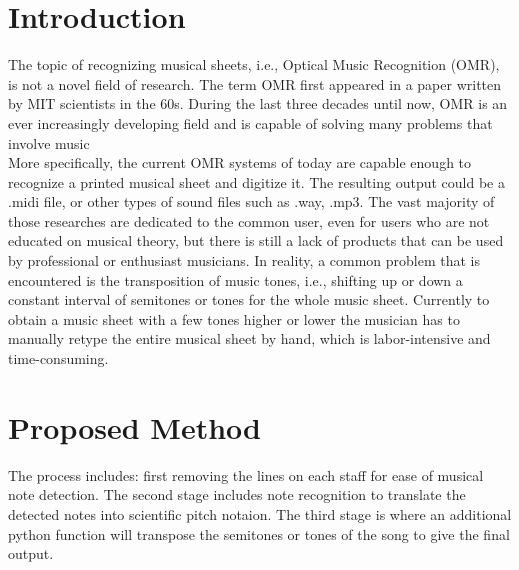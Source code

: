 \documentclass[a4paper,12pt]{report}
\begin{document}



\section{Introduction}

The topic of recognizing musical sheets, i.e., Optical Music Recognition (OMR),
is not a novel field of research. The term OMR first appeared in a paper written
by MIT scientists in the 60s.  During the last three decades until now, OMR is
an ever increasingly developing field and is capable of solving many problems
that involve music \cite{Shatri2020a}\\

More specifically, the current OMR systems of today are capable enough to
recognize a printed musical sheet and digitize it. The resulting output could be
a .midi file, or other types of sound files such as .way, .mp3. The vast
majority of those researches are dedicated to the common user, even for users
who are not educated on musical theory, but there is still a lack of products
that can be used by professional or enthusiast musicians. In reality, a common
problem that is encountered is the transposition of music tones, i.e., shifting up or down a constant interval of
semitones or tones for the whole music sheet. Currently to obtain a music
sheet with a few tones higher or lower the musician has to manually retype the
entire musical sheet by hand, which is labor-intensive and time-consuming.


\clearpage

\section{Proposed Method}
The process includes: first removing the lines on each staff for ease of musical
note detection. The second stage includes note
recognition to translate the detected notes into scientific pitch notaion. The third stage is
where an additional python function will transpose the semitones or tones of the song to give
the final output. 
\end{document}
